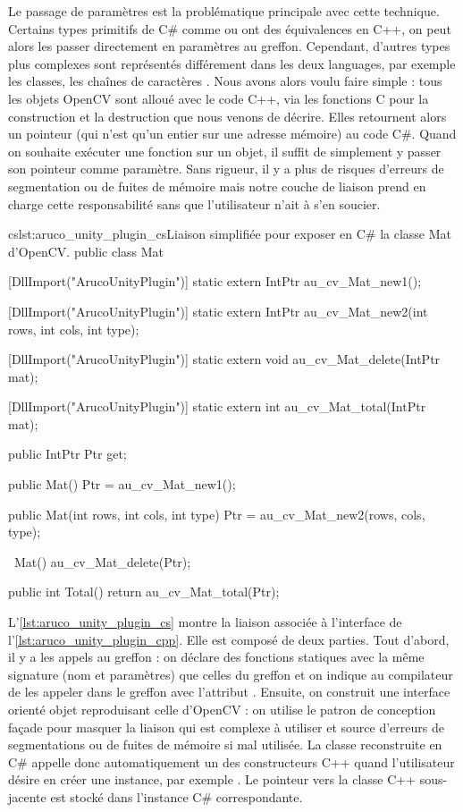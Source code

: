 Le passage de paramètres est la problématique principale avec cette technique. Certains types primitifs de C\# comme  ou  ont des équivalences en C++, on peut alors les passer directement en paramètres au greffon. Cependant, d'autres types plus complexes sont représentés différement dans les deux languages, par exemple les classes, les chaînes de caractères \cite{Peterson2015}. Nous avons alors voulu faire simple : tous les objets OpenCV sont alloué avec le code C++, via les fonctions C pour la construction et la destruction que nous venons de décrire. Elles retournent alors un pointeur (qui n'est qu'un entier sur une adresse mémoire) au code C\#. Quand on souhaite exécuter une fonction sur un objet, il suffit de simplement y passer son pointeur comme paramètre. Sans rigueur, il y a plus de risques d'erreurs de segmentation ou de fuites de mémoire mais notre couche de liaison prend en charge cette responsabilité sans que l'utilisateur n'ait à s'en soucier.

\begin{listingETS}{cs}{lst:aruco_unity_plugin_cs}{Liaison simplifiée pour exposer en C\# la classe Mat d'OpenCV.}
  public class Mat
  {
    [DllImport("ArucoUnityPlugin")]
    static extern IntPtr au_cv_Mat_new1();

    [DllImport("ArucoUnityPlugin")]
    static extern IntPtr au_cv_Mat_new2(int rows, int cols, int type);

    [DllImport("ArucoUnityPlugin")]
    static extern void au_cv_Mat_delete(IntPtr mat);
    
    [DllImport("ArucoUnityPlugin")]
    static extern int au_cv_Mat_total(IntPtr mat);

    public IntPtr Ptr { get; }

    public Mat()
    {
      Ptr = au_cv_Mat_new1();
    }

    public Mat(int rows, int cols, int type)
    {
      Ptr = au_cv_Mat_new2(rows, cols, type);
    }

    ~Mat()
    {
      au_cv_Mat_delete(Ptr);
    }

    public int Total()
    {
      return au_cv_Mat_total(Ptr);
    }
  }
\end{listingETS}

L'\autoref{lst:aruco_unity_plugin_cs} montre la liaison associée à l'interface de l'\autoref{lst:aruco_unity_plugin_cpp}. Elle est composé de deux parties. Tout d'abord, il y a les appels au greffon : on déclare des fonctions statiques avec la même signature (nom et paramètres) que celles du greffon et on indique au compilateur de les appeler dans le greffon avec l'attribut . Ensuite, on construit une interface orienté objet reproduisant celle d'OpenCV : on utilise le patron de conception façade pour masquer la liaison qui est complexe à utiliser et source d'erreurs de segmentations ou de fuites de mémoire si mal utilisée. La classe  reconstruite en C\# appelle donc automatiquement un des constructeurs C++ quand l'utilisateur désire en créer une instance, par exemple . Le pointeur vers la classe C++ sous-jacente est stocké dans l'instance C\# correspondante.

